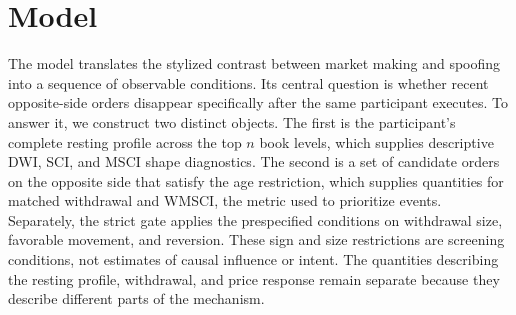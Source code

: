 \documentclass[11pt]{article}
\newenvironment{review}{\begingroup\color{blue}}{\endgroup}
\begin{document}
\section{Model}
\label{sec:model}
The model translates the stylized contrast between market making and spoofing into a sequence of observable conditions. Its
central question is whether recent opposite-side orders disappear specifically after the same participant executes. To
answer it, we construct two distinct objects. The first is the participant's complete resting profile across the top $n$
book levels, which supplies descriptive DWI, SCI, and MSCI shape diagnostics. The second is \begin{review}a set of candidate orders on the opposite side that satisfy the age restriction\end{review}, which supplies \begin{review}quantities for matched withdrawal and WMSCI, the metric used to prioritize events\end{review}.
Separately, the strict gate applies \begin{review}the prespecified conditions on withdrawal size, favorable movement, and reversion\end{review}. These
sign and size restrictions are screening conditions, not estimates of causal influence or intent. \begin{review}The quantities describing the resting profile, withdrawal, and price response\end{review} remain separate because they describe different parts of the mechanism.

\end{document}
